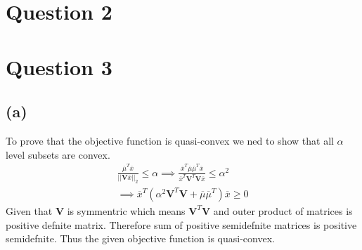 \documentclass{article}
\begin{document}
\section*{\hfil Question 2}
\section*{\hfil Question 3}
\subsection*{(a)}
To prove that the objective function is quasi-convex we ned to show that all $\alpha$ level subsets are convex.
	\begin{gather*}
		\frac{\overline{\mu}^T\overline{x}}{||\mathbf{V}\overline{x}||_2} \le \alpha \implies \frac{\overline{x}^T\overline{\mu}\overline{\mu}^T\overline{x}}{\overline{x}^T\mathbf{V}^T\mathbf{V}\overline{x}} \le \alpha ^2\\
		\implies \overline{x}^T\left(\alpha ^2\mathbf{V}^T\mathbf{V} + \overline{\mu}\overline{\mu}^T\right)\overline{x} \ge 0
	\end{gather*}
	Given that $\mathbf{V}$ is symmentric which means $\mathbf{V}^T\mathbf{V}$ and  outer product of matrices is positive defnite matrix. Therefore sum of positive semidefnite matrices is positive semidefnite. Thus the given objective function is quasi-convex.
\end{document}
